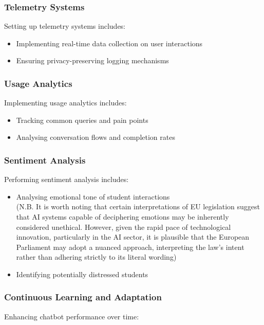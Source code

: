 \documentclass[14pt,a4paper]{article}
\begin{document}
\begin{multicols}{2}
\subsubsection*{Telemetry Systems}
Setting up telemetry systems \textit{\parencite[pp. 30-60]{Vadapalli2023}} includes:
\begin{itemize}
    \item Implementing real-time data collection on user interactions
    \item Ensuring privacy-preserving logging mechanisms
\end{itemize}



\subsubsection{Usage Analytics}
Implementing usage analytics \textit{\parencite[pp. 50-100]{Beasley2023}} includes:
\begin{itemize}
    \item Tracking common queries and pain points
    \item Analysing conversation flows and completion rates
\end{itemize}


\subsubsection*{Sentiment Analysis}
Performing sentiment analysis \textit{\parencite[pp. 50-100]{Liu2023}} includes:
\begin{itemize}
    \item Analysing emotional tone of student interactions\\ (N.B. It is worth noting that certain interpretations of EU legislation suggest that AI systems capable of deciphering emotions may be inherently considered unethical. However, given the rapid pace of technological innovation, particularly in the AI sector, it is plausible that the European Parliament may adopt a nuanced approach, interpreting the law's intent rather than adhering strictly to its literal wording) \textit{\parencite[pp. 150-175]{Dignum2023}}
    \item Identifying potentially distressed students
\end{itemize}

\subsubsection{Continuous Learning and Adaptation}
Enhancing chatbot performance over time:


\end{multicols}
\end{document}
